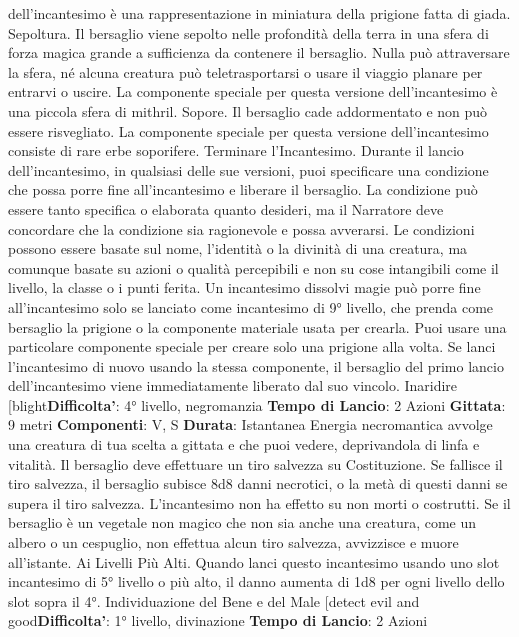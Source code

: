 \begin{multicols}{2}
dell’incantesimo è una rappresentazione in miniatura
della prigione fatta di giada.
Sepoltura. Il bersaglio viene sepolto nelle profondità
della terra in una sfera di forza magica grande a
sufficienza da
contenere il bersaglio. Nulla può attraversare la sfera,
né alcuna creatura può teletrasportarsi o usare il
viaggio planare per entrarvi o uscire.
La componente speciale per questa versione
dell’incantesimo è una piccola sfera di mithril.
Sopore. Il bersaglio cade addormentato e non può
essere risvegliato. La componente speciale per questa
versione dell’incantesimo consiste di rare erbe
soporifere.
Terminare l’Incantesimo. Durante il lancio
dell’incantesimo, in qualsiasi delle sue versioni, puoi
specificare una condizione che possa porre fine
all’incantesimo e liberare il bersaglio. La condizione può
essere tanto specifica o elaborata quanto desideri, ma il
Narratore deve concordare che la condizione sia ragionevole
e possa avverarsi. Le condizioni possono essere
basate sul nome, l’identità o la divinità di una creatura,
ma comunque basate su azioni o qualità percepibili e
non su cose intangibili come il livello, la classe o i punti
ferita.
Un incantesimo dissolvi magie può porre fine
all’incantesimo solo se lanciato come incantesimo di 9°
livello, che prenda come bersaglio la prigione o la
componente materiale usata per crearla.
Puoi usare una particolare componente speciale per
creare solo una prigione alla volta. Se lanci
l’incantesimo di nuovo usando la stessa componente, il
bersaglio del primo lancio dell’incantesimo viene
immediatamente liberato dal suo vincolo.
Inaridire
[blight\textbf{Difficolta'}:
4° livello, negromanzia
\textbf{Tempo di Lancio}: 2 Azioni
\textbf{Gittata}: 9 metri
\textbf{Componenti}: V, S
\textbf{Durata}: Istantanea
Energia necromantica avvolge una creatura di tua
scelta a gittata e che puoi vedere, deprivandola di linfa
e vitalità. Il bersaglio deve effettuare un tiro salvezza su
Costituzione. Se fallisce il tiro salvezza, il bersaglio
subisce 8d8 danni necrotici, o la metà di questi danni se
supera il tiro salvezza. L’incantesimo non ha effetto su
non morti o costrutti.
Se il bersaglio è un vegetale non magico che non sia
anche una creatura, come un albero o un cespuglio,
non effettua alcun tiro salvezza, avvizzisce e muore
all’istante.
Ai Livelli Più Alti. Quando lanci questo incantesimo
usando uno slot incantesimo di 5° livello o più alto, il
danno aumenta di 1d8 per ogni livello dello slot sopra il
4°.
Individuazione del Bene e del Male
[detect evil and good\textbf{Difficolta'}:
1° livello, divinazione
\textbf{Tempo di Lancio}: 2 Azioni

\end{multicols}

